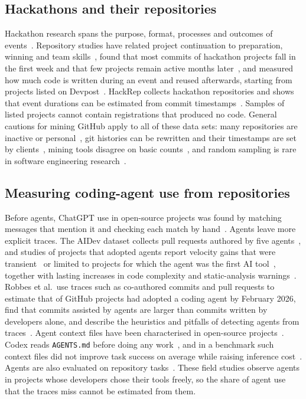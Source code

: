 \documentclass{article}
\begin{document}
\subsection{Hackathons and their repositories}
Hackathon research spans the purpose, format, processes and outcomes of events~\cite{chau2023hackathons}. Repository studies have related project continuation to preparation, winning and team skills~\cite{nolte2020hackathon}, found that most commits of hackathon projects fall in the first week and that few projects remain active months later~\cite{mcintosh2021hackathon}, and measured how much code is written during an event and reused afterwards, starting from \devpostprojects{} projects listed on Devpost~\cite{imam2021secretlife,mahmoud2022oneoff}. HackRep collects \hackrepsize{} hackathon repositories and shows that event durations can be estimated from commit timestamps~\cite{halmans2026hackrep}. Samples of listed projects cannot contain registrations that produced no code. General cautions for mining GitHub apply to all of these data sets: many repositories are inactive or personal~\cite{kalliamvakou2014perils}, git histories can be rewritten and their timestamps are set by clients~\cite{bird2009git}, mining tools disagree on basic counts~\cite{hoess2025toolmatter}, and random sampling is rare in software engineering research~\cite{baltes2022sampling}.

\subsection{Measuring coding-agent use from repositories}
Before agents, ChatGPT use in open-source projects was found by matching messages that mention it and checking each match by hand~\cite{tufano2024chatgpt}. Agents leave more explicit traces. The AIDev dataset collects pull requests authored by five agents~\cite{li2025aidev}, and studies of projects that adopted agents report velocity gains that were transient~\cite{he2026cursor} or limited to projects for which the agent was the first AI tool~\cite{agarwal2026aiides}, together with lasting increases in code complexity and static-analysis warnings~\cite{he2026cursor}. Robbes et al.\ use traces such as co-authored commits and pull requests to estimate that \robbesrate{} of \robbesprojects{} GitHub projects had adopted a coding agent by February 2026, find that commits assisted by agents are larger than commits written by developers alone, and describe the heuristics and pitfalls of detecting agents from traces~\cite{robbes2026agenticmuch,robbes2026heuristics}. Agent context files have been characterised in open-source projects~\cite{chatlatanagulchai2025agentreadmes}. Codex reads \texttt{AGENTS.md} before doing any work~\cite{openai2026agentsmd}, and in a benchmark such context files did not improve task success on average while raising inference cost~\cite{gloaguen2026agentsmd}. Agents are also evaluated on repository tasks~\cite{jimenez2023swebench,yang2024sweagent}. These field studies observe agents in projects whose developers chose their tools freely, so the share of agent use that the traces miss cannot be estimated from them.
\end{document}
